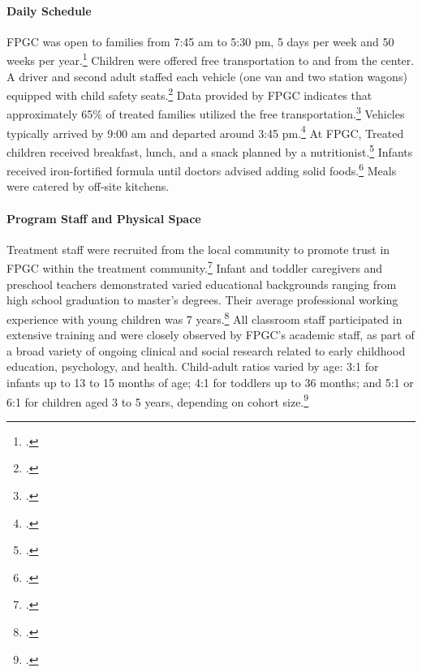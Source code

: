 \begin{appendices}
\paragraph{Daily Schedule}
\noindent FPGC was open to families from 7:45 am to 5:30 pm, 5 days per week and 50 weeks per year.\footnote{\citet{Ramey_Collier_etal_1976_CarolinaAbecedarianProject}.} Children were offered free transportation to and from the center. A driver and second adult staffed each vehicle (one van and two station wagons) equipped with child safety seats.\footnote{\citet{Ramey_Campbell_1979_SR,abc2014-2015interviews}.} Data provided by FPGC indicates that approximately 65\% of treated families utilized the free transportation.\footnote{\citet{Barnett_Masse_2002_benefitcost}.} Vehicles typically arrived by 9:00 am and departed around 3:45 pm.\footnote{\citet{Ramey-et-al_1977_Intro-to-ABC}.} At FPGC, Treated children received breakfast, lunch, and a snack planned by a nutritionist.\footnote{ \citet{Haskins_1985_CD,Ramey-et-al_1977_Intro-to-ABC}.} Infants received iron-fortified formula until doctors advised adding solid foods.\footnote{\citet{Campbell_Conti_etal_2014_EarlyChildhoodInvestments,abc2014-2015interviews}.} Meals were catered by off-site kitchens. \\

\paragraph{Program Staff and Physical Space}
\noindent Treatment staff were recruited from the local community to promote trust in FPGC within the treatment community.\footnote{\citet{Ramey-et-al_1977_Intro-to-ABC,Feagans_1996_Childrens-Talk,abc2014-2015interviews}.} Infant and toddler caregivers and preschool teachers demonstrated varied educational backgrounds ranging from high school graduation to master's degrees. Their average professional working experience with young children was 7 years.\footnote{\citet{Ramey_McGinness_etal_1982_Abecedarianapproach}.} All classroom staff participated in extensive training and were closely observed by FPGC's academic staff, as part of a broad variety of ongoing clinical and social research related to early childhood education, psychology, and health. Child-adult ratios varied by age: 3:1 for infants up to 13 to 15 months of age; 4:1 for toddlers up to 36 months; and 5:1 or 6:1 for children aged 3 to 5 years, depending on cohort size.\footnote{\citet{Ramey-et-al_1977_Intro-to-ABC,Ramey_Campbell_1979_SR,Ramey_McGinness_etal_1982_Abecedarianapproach}.}\\


\end{appendices}
